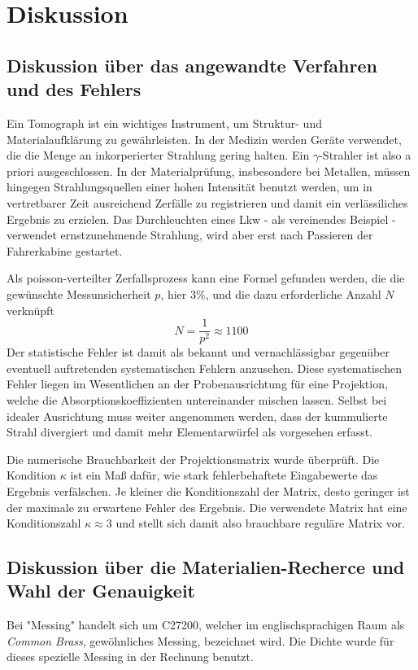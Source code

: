 \section{Diskussion}
\label{sec:Diskussion}

\subsection{Diskussion über das angewandte Verfahren und des Fehlers}
\label{sec:Diskussion1}
Ein Tomograph ist ein wichtiges Instrument, um Struktur- und Materialaufklärung
zu gewährleisten. In der Medizin werden Geräte verwendet, die die Menge an
inkorperierter Strahlung gering halten. Ein $\gamma$-Strahler ist also a priori
ausgeschlossen. In der Materialprüfung, insbesondere bei Metallen, müssen hingegen
Strahlungsquellen einer hohen Intensität benutzt werden, um in vertretbarer Zeit
ausreichend Zerfälle zu registrieren und damit ein verlässiliches Ergebnis zu
erzielen. Das Durchleuchten eines Lkw - als vereinendes Beispiel - verwendet
ernstzunehmende Strahlung, wird aber erst nach Passieren der Fahrerkabine gestartet.

Als poisson-verteilter Zerfallsprozess kann eine Formel gefunden werden, die die
gewünschte Messunsicherheit $p$, hier 3\%, und die dazu erforderliche Anzahl $N$
verknüpft
\begin{equation}
  N=\frac{1}{p^2}\approx 1100
\end{equation}
Der statistische Fehler ist damit als bekannt und vernachlässigbar gegenüber eventuell
auftretenden systematischen Fehlern anzusehen. Diese systematischen Fehler liegen
im Wesentlichen an der Probenausrichtung für eine Projektion, welche die Absorptionskoeffizienten
untereinander mischen lassen. Selbst bei idealer Ausrichtung muss weiter angenommen
werden, dass der kummulierte Strahl divergiert und damit mehr Elementarwürfel als
vorgesehen erfasst.

Die numerische Brauchbarkeit der Projektionsmatrix wurde überprüft.
Die Kondition $\kappa$ ist ein Maß dafür, wie stark fehlerbehaftete Eingabewerte
das Ergebnis verfälschen. Je kleiner die Konditionszahl der Matrix, desto geringer
ist der maximale zu erwartene Fehler des Ergebnis.
Die verwendete Matrix hat eine Konditionszahl $\kappa\approx3$ und stellt sich damit
also brauchbare reguläre Matrix vor.
\subsection{Diskussion über die Materialien-Recherce und Wahl der Genauigkeit}
\label{sec:Diskussion2}
Bei "Messing" handelt sich um C27200, welcher im englischsprachigen Raum
als \textit{Common Brass}, gewöhnliches Messing, bezeichnet wird. Die Dichte
wurde für dieses spezielle Messing in der Rechnung benutzt.

